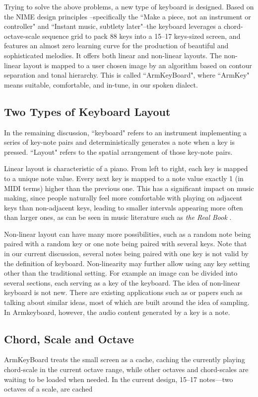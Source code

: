 Trying to solve the above problems, a new type of keyboard is designed. Based on the NIME design principles \cite{cook2001principles}--specifically the ``Make a piece, not an instrument or controller" and ``Instant music, subtlety later"--the keyboard leverages a chord-octave-scale sequence grid to pack 88 keys into a 15--17 keys-sized screen, and features an almost zero learning curve for the production of beautiful and sophisticated melodies. It offers both linear and non-linear layouts. The non-linear layout is mapped to a user chosen image by an algorithm based on contour separation and tonal hierarchy. This is called ``ArmKeyBoard", where ``ArmKey" means suitable, comfortable, and in-tune, in our spoken dialect.

\subsection{Two Types of Keyboard Layout}
In the remaining discussion, ``keyboard" refers to an instrument implementing a series of key-note pairs and deterministically
generates a note when a key is pressed. ``Layout" refers to the spatial arrangement of those key-note pairs.

Linear layout is characteristic of a piano. From left to right, each key is mapped to a unique note value. Every next key is mapped to
a note value exactly 1 (in MIDI terms) higher than the previous one. This has a significant impact on music making, since people naturally feel more comfortable with playing on adjacent keys than non-adjacent keys, leading to smaller intervals appearing more often than larger ones, as can be seen in music literature such as \textit{the Real Book} \cite{therealbook6th}.

Non-linear layout can have many more possibilities, such as a random note being paired with a random key or one note being paired with
several keys. Note that in our current discussion, several notes being paired with one key is not valid by the definition of keyboard. Non-linearity may further allow using any key setting other than the traditional setting. For example an image can be divided into several sections, each serving as a key of the keyboard. The idea of non-linear keyboard is not new. There are existing applications such as \cite{kontakts} or papers such as \cite{kruge2011madpad} talking about similar ideas, most of which are built around the idea of sampling. In Armkeyboard, however, the audio content generated by a key is a note.

\subsection{Chord, Scale and Octave}
ArmKeyBoard treats the small screen as a cache, caching the currently playing chord-scale in the current octave range, while other
octaves and chord-scales are waiting to be loaded when needed. In the current design, 15--17 notes---two octaves of a scale, are cached

